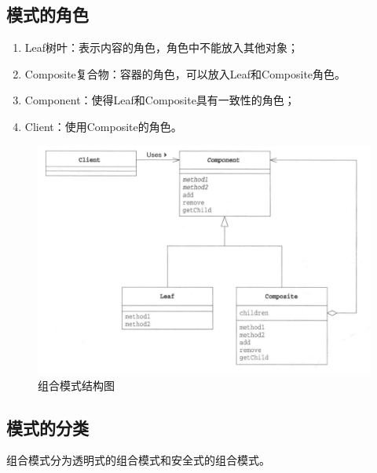 \subsection{模式的角色}
\begin{enumerate}
	\item Leaf树叶：表示内容的角色，角色中不能放入其他对象；
	\item Composite复合物：容器的角色，可以放入Leaf和Composite角色。
	\item Component：使得Leaf和Composite具有一致性的角色；
	\item Client：使用Composite的角色。
\end{enumerate}
\begin{figure}[!h]
	\centering
	\includegraphics[width=\textwidth]{image/11-3}
	\caption{组合模式结构图}
\end{figure}
\subsection{模式的分类}
组合模式分为透明式的组合模式和安全式的组合模式。
